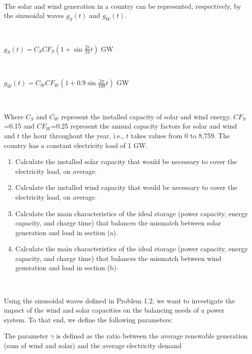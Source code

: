 \documentclass[10pt]{article}
\newenvironment{problem}[2][Problem]{\begin{trivlist}
\item[\hskip \labelsep {\bfseries #1}\hskip \labelsep {\bfseries #2.}]}{\end{trivlist}}
\begin{document}
\

\begin{problem}{1.2}
The solar and wind generation in a country can be represented, respectively, by the sinusoidal waves $g_S(t)$ and $g_W(t)$. 

\

$g_S(t)=C_S  CF_S (1+\sin{\frac{2\pi}{24} t})$  GW

\

$g_W (t)=C_W  CF_W (1+0.9\sin{\frac{2\pi}{168} t})$  GW

\

Where $C_S$ and $C_W$ represent the installed capacity of solar and wind energy. $CF_S$=0.15 and $CF_W$=0.25 represent the annual capacity factors for solar and wind and $t$ the hour throughout the year, i.e., $t$ takes values from 0 to 8,759. The country has a constant electricity load of 1 GW.

\begin{enumerate}
\item[a)] Calculate the installed solar capacity that would be necessary to cover the electricity load, on average.  
\item[b)] Calculate the installed wind capacity that would be necessary to cover the electricity load, on average.  
\item[c)] Calculate the main characteristics of the ideal storage (power capacity, energy capacity, and charge time) that balances the mismatch between solar generation and load in section (a).
\item[d)] Calculate the main characteristics of the ideal storage (power capacity, energy capacity, and charge time) that balances the mismatch between wind generation and load in section (b).

\end{enumerate}

\end{problem}

\

\begin{problem}{1.3}

\end{problem}
Using the sinusoidal waves defined in Problem 1.2, we want to investigate the impact of the wind and solar capacities on the balancing needs of a power system. To that end, we define the following parameters:

The parameter $\gamma$ is defined as the ratio between the average renewable generation (sum of wind and solar) and the average electricity demand 
\end{document}
